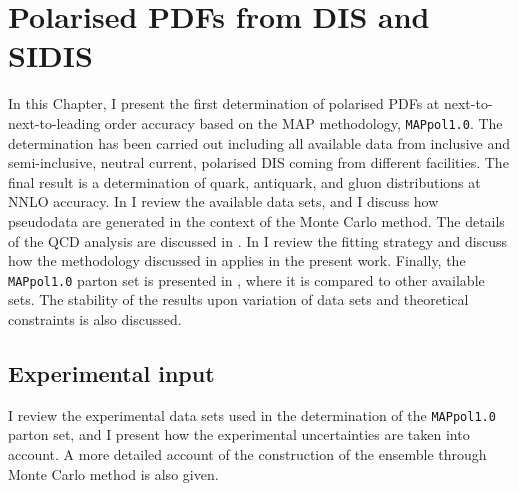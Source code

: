 \chapter{Polarised PDFs from DIS and SIDIS}
\label{ch:4}

In this Chapter, I present the first determination of polarised PDFs at next-to-next-to-leading order accuracy based on the MAP methodology, \texttt{MAPpol1.0}. The determination has been carried out including all available data from inclusive and semi-inclusive, neutral current, polarised DIS coming from different facilities. The final result is a determination of quark, antiquark, and gluon distributions at NNLO accuracy. In  I review the available data sets, and I discuss how pseudodata are generated in the context of the Monte Carlo method. The details of the QCD analysis are discussed in . In  I review the fitting strategy and discuss how the methodology discussed in  applies in the present work. Finally, the \texttt{MAPpol1.0} parton set is presented in , where it is compared to other available sets. The stability of the results upon variation of data sets and theoretical constraints is also discussed.

\section{Experimental input}
\label{sec:4.1}

I review the experimental data sets used in the determination of the \texttt{MAPpol1.0} parton set, and I present how the experimental uncertainties are taken into account. A more detailed account of the construction of the ensemble through Monte Carlo method is also given.

